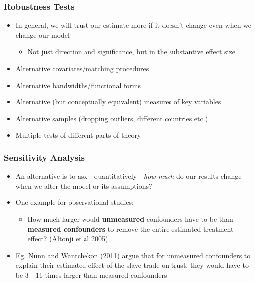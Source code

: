 \documentclass[xcolor=x11names,compress]{beamer}\usepackage[]{graphicx}\usepackage[]{color}
\renewcommand{\(}{\begin{columns}}
\renewcommand{\)}{\end{columns}}
\newcommand{\<}[1]{\begin{column}{#1}}
\renewcommand{\>}{\end{column}}
\begin{document}
\begin{frame}
\frametitle{Robustness Tests}
\begin{itemize}
\item In general, we will trust our estimate more if it doesn't change even when we change our model
\begin{itemize}
\item Not just direction and significance, but in the substantive effect size
\end{itemize}
\item Alternative covariates/matching procedures
\pause
\item Alternative bandwidths/functional forms
\pause
\item Alternative (but conceptually equivalent) measures of key variables
\pause
\item Alternative samples (dropping outliers, different countries etc.)
\pause
\item Multiple tests of different parts of theory
\end{itemize}
\end{frame}

\begin{frame}
\frametitle{Sensitivity Analysis}
\begin{itemize}
\item An alternative is to ask - quantitatively - \textit{how much} do our results change when we alter the model or its assumptions?
\pause
\item One example for observational studies:
\begin{itemize}
\item How much larger would \textbf{unmeasured} confounders have to be than \textbf{measured confounders} to remove the entire estimated treatment effect? (Altonji et al 2005)
\pause
\end{itemize}
\item Eg. Nunn and Wantchekon (2011) argue that for unmeasured confounders to explain their estimated effect of the slave trade on trust, they would have to be 3 - 11 times larger than measured confounders
\end{itemize}
\end{frame}
\end{document}
